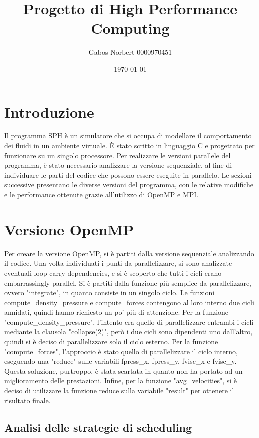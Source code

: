 \documentclass[a4paper,12pt, oneside]{article}
\title{Progetto di High Performance Computing}
\author{Gabos Norbert 0000970451}
\date{\today}
\begin{document}
\maketitle

\section{Introduzione}

Il programma SPH è un simulatore che si occupa di modellare il comportamento dei fluidi in un
ambiente virtuale. È stato scritto in linguaggio C e progettato per funzionare su un singolo
processore. Per realizzare le versioni parallele del programma, è stato necessario analizzare
la versione sequenziale, al fine di individuare le parti del codice che possono essere eseguite
in parallelo. Le sezioni successive presentano le diverse versioni del programma, con le
relative modifiche e le performance ottenute grazie all'utilizzo di OpenMP e MPI.

\section{Versione OpenMP}

Per creare la versione OpenMP, si è partiti dalla versione sequenziale analizzando il codice.
Una volta individuati i punti da parallelizzare, si sono analizzate eventuali loop carry
dependencies, e si è scoperto che tutti i cicli erano embarrassingly parallel. Si è partiti
dalla funzione più semplice da parallelizzare, ovvero "integrate", in quanto consiste in un
singolo ciclo. Le funzioni compute\_density\_pressure e compute\_forces contengono al loro
interno due cicli annidati, quindi hanno richiesto un po' più di attenzione.
Per la funzione "compute\_density\_pressure", l'intento era quello di parallelizzare entrambi
i cicli mediante la clausola "collapse(2)", però i due cicli sono dipendenti uno dall'altro,
quindi si è deciso di parallelizzare solo il ciclo esterno. Per la funzione "compute\_forces",
l'approccio è stato quello di parallelizzare il ciclo interno, eseguendo una "reduce" sulle
variabili fpress\_x, fpress\_y, fvisc\_x e fvisc\_y. Questa soluzione, purtroppo, è stata
scartata in quanto non ha portato ad un miglioramento delle prestazioni.
Infine, per la funzione "avg\_velocities", si è deciso di utilizzare la funzione reduce sulla
variabile "result" per ottenere il risultato finale.

\subsection{Analisi delle strategie di scheduling}
\end{document}
